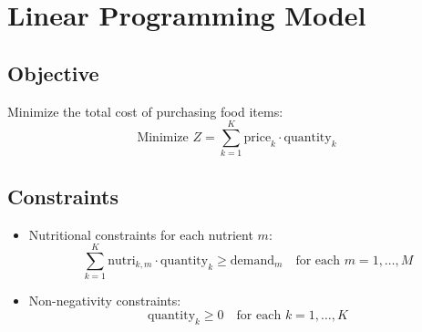 \documentclass{article}
\begin{document}
\section*{Linear Programming Model}

\subsection*{Objective}
Minimize the total cost of purchasing food items:
\[
\text{Minimize } Z = \sum_{k=1}^{K} \text{price}_k \cdot \text{quantity}_k
\]

\subsection*{Constraints}
\begin{itemize}
    \item Nutritional constraints for each nutrient \( m \):
    \[
    \sum_{k=1}^{K} \text{nutri}_{k,m} \cdot \text{quantity}_k \geq \text{demand}_m \quad \text{for each } m = 1, \ldots, M
    \]

    \item Non-negativity constraints:
    \[
    \text{quantity}_k \geq 0 \quad \text{for each } k = 1, \ldots, K
    \]
\end{itemize}
\end{document}
